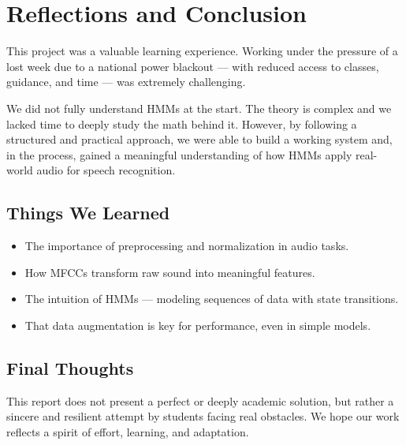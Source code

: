 \documentclass{article}
\begin{document}
\section*{Reflections and Conclusion}

This project was a valuable learning experience. Working under the pressure of a lost week due to a national power blackout — with reduced access to classes, guidance, and time — was extremely challenging.

We did not fully understand HMMs at the start. The theory is complex and we lacked time to deeply study the math behind it. However, by following a structured and practical approach, we were able to build a working system and, in the process, gained a meaningful understanding of how HMMs apply real-world audio for speech recognition.

\subsection*{Things We Learned}

\begin{itemize}
    \item The importance of preprocessing and normalization in audio tasks.
    \item How MFCCs transform raw sound into meaningful features.
    \item The intuition of HMMs — modeling sequences of data with state transitions.
    \item That data augmentation is key for performance, even in simple models.
\end{itemize}

\subsection*{Final Thoughts}

This report does not present a perfect or deeply academic solution, but rather a sincere and resilient attempt by students facing real obstacles. We hope our work reflects a spirit of effort, learning, and adaptation.
\end{document}
